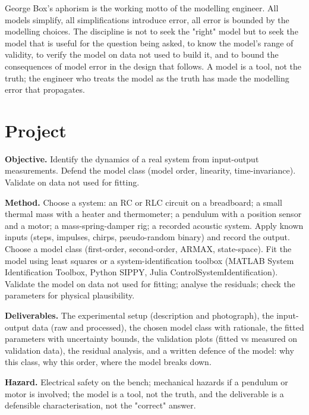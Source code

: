 \begin{principle}
George Box's aphorism is the working motto of the modelling engineer. All models simplify, all simplifications introduce error, all error is bounded by the modelling choices. The discipline is not to seek the "right" model but to seek the model that is useful for the question being asked, to know the model's range of validity, to verify the model on data not used to build it, and to bound the consequences of model error in the design that follows. A model is a tool, not the truth; the engineer who treats the model as the truth has made the modelling error that propagates.
\end{principle}

\section{Project}

\begin{project}
\textbf{Objective.} Identify the dynamics of a real system from input-output measurements. Defend the model class (model order, linearity, time-invariance). Validate on data not used for fitting.

\textbf{Method.} Choose a system: an RC or RLC circuit on a breadboard; a small thermal mass with a heater and thermometer; a pendulum with a position sensor and a motor; a mass-spring-damper rig; a recorded acoustic system. Apply known inputs (steps, impulses, chirps, pseudo-random binary) and record the output. Choose a model class (first-order, second-order, ARMAX, state-space). Fit the model using least squares or a system-identification toolbox (MATLAB System Identification Toolbox, Python SIPPY, Julia ControlSystemIdentification). Validate the model on data not used for fitting; analyse the residuals; check the parameters for physical plausibility.

\textbf{Deliverables.} The experimental setup (description and photograph), the input-output data (raw and processed), the chosen model class with rationale, the fitted parameters with uncertainty bounds, the validation plots (fitted vs measured on validation data), the residual analysis, and a written defence of the model: why this class, why this order, where the model breaks down.

\textbf{Hazard.} Electrical safety on the bench; mechanical hazards if a pendulum or motor is involved; the model is a tool, not the truth, and the deliverable is a defensible characterisation, not the "correct" answer.
\end{project}

